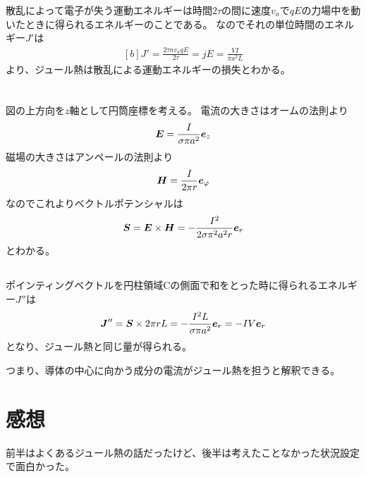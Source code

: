 \documentclass[../ap_2012.tex]{subfiles}
\begin{document}
散乱によって電子が失う運動エネルギーは時間\(2\tau\)の間に速度\(v_a\)で\(qE\)の力場中を動いたときに得られるエネルギーのことである。
なのでそれの単位時間のエネルギー\(J'\)は
\begin{equation}\begin{aligned}[b]
    J' = \frac{2\tau n v_a qE }{2\tau}= jE = \frac{VI}{\pi a^2 L}
\end{aligned}\end{equation}
より、ジュール熱は散乱による運動エネルギーの損失とわかる。

\section{}
\subsection{}
図の上方向を\(z\)軸として円筒座標を考える。
電流の大きさはオームの法則より
\begin{equation}\begin{aligned}[b]
    \vb*{E} =\frac{I}{\sigma \pi a^2}\vb*{e}_z
\end{aligned}\end{equation}
磁場の大きさはアンペールの法則より
\begin{equation}\begin{aligned}[b]
    \vb*{H} = \frac{I}{2\pi r}\vb*{e}_\varphi
\end{aligned}\end{equation}
なのでこれよりベクトルポテンシャルは
\begin{equation}\begin{aligned}[b]
    \vb*{S} = \vb*{E}\times \vb*{H} = -\frac{I^2}{2\sigma\pi^2 a^2 r}\vb*{e}_r
\end{aligned}\end{equation}
とわかる。
\subsection{}
ポインティングベクトルを円柱領域Cの側面で和をとった時に得られるエネルギー\(J''\)は
\begin{equation}\begin{aligned}[b]
    \vb*{J}'' = \vb*{S}\times 2\pi r L = -\frac{I^2L}{\sigma\pi a^2}\vb*{e}_r = -IV \vb*{e}_r
\end{aligned}\end{equation}
となり、ジュール熱と同じ量が得られる。

つまり、導体の中心に向かう成分の電流がジュール熱を担うと解釈できる。


\section*{感想}
前半はよくあるジュール熱の話だったけど、後半は考えたことなかった状況設定で面白かった。
\end{document}
